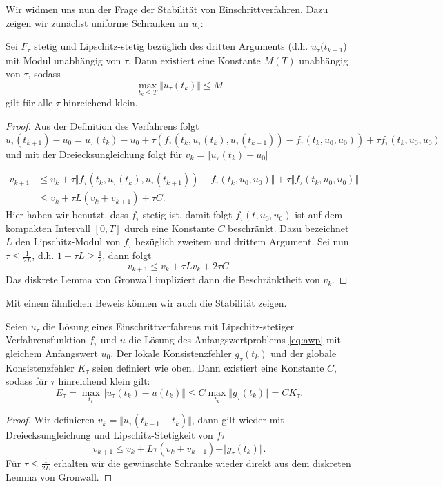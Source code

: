 Wir widmen uns nun der Frage der Stabilität von Einschrittverfahren. Dazu zeigen wir zunächst uniforme Schranken an $u_\tau$:
%
\begin{lemma}{}{}
Sei $F_\tau$ stetig und Lipschitz-stetig bezüglich des dritten Arguments (d.h. $u_\tau(t_{k+1}$) mit Modul unabhängig von $\tau$. Dann existiert eine Konstante $M(T)$ unabhängig von $\tau$, sodass
$$ \max_{t_k \leq T} \Vert u_\tau(t_k) \Vert \leq M $$
gilt für alle $\tau$ hinreichend klein.
\end{lemma}
%
\begin{proof}
Aus der Definition des Verfahrens folgt 
$$ u_\tau(t_{k+1})-u_0 = u_\tau(t_k) - u_0 + \tau (f_\tau(t_k,u_\tau(t_k),u_\tau(t_{k+1}))-f_\tau(t_k,u_0,u_0)) + \tau f_\tau(t_k,u_0,u_0) $$
und mit der Dreiecksungleichung folgt für $v_k = \Vert u_\tau(t_k) - u_0 \Vert$

\begin{align*} v_{k+1} &\leq v_k + \tau \Vert f_\tau(t_k,u_\tau(t_k),u_\tau(t_{k+1}))-f_\tau(t_k,u_0,u_0) \Vert + \tau \Vert f_\tau(t_k,u_0,u_0) \Vert \\
&\leq  v_k + \tau L (v_k + v_{k+1}) + \tau C. 
\end{align*}
%
Hier haben wir benutzt, dass $f_\tau$ stetig ist, damit folgt $ f_\tau(t,u_0,u_0) $ ist auf dem kompakten Intervall  $[0,T]$ durch eine Konstante $C$ beschränkt. Dazu bezeichnet $L$ den Lipschitz-Modul von $f_\tau$ bezüglich zweitem und drittem Argument. Sei nun $\tau \leq \frac{1}{2L}$, d.h. $1- \tau L \geq \frac{1}2$, dann folgt 
$$ v_{k+1} \leq v_k + {\tau L} v_k + 2 \tau C. $$
Das diskrete Lemma von Gronwall impliziert dann die Beschränktheit von $v_k$.
\end{proof}

Mit einem ähnlichen Beweis können wir auch die Stabilität zeigen.
%
\begin{theorem}{}{}
Seien $u_\tau$ die Lösung eines Einschrittverfahrens mit Lipschitz-stetiger Verfahrensfunktion $f_\tau$ und $u$ die Lösung des Anfangswertproblems \eqref{eq:awp} mit gleichem Anfangswert $u_0$. Der lokale Konsistenzfehler $g_\tau(t_k)$ und der globale Konsistenzfehler $K_\tau$ seien definiert wie oben. Dann existiert eine Konstante $C$, sodass für $\tau$ hinreichend klein  gilt:
$$ E_\tau = \max_{t_k} \Vert u_\tau(t_k) - u(t_k) \Vert \leq C \max_{t_k} \Vert g_\tau(t_k) \Vert = C K_\tau. $$
\end{theorem}
%
\begin{proof}
Wir definieren $v_k = \Vert u_\tau(t_{k+1} - t_k) \Vert$, dann gilt wieder mit Dreiecksungleichung und Lipschitz-Stetigkeit von $f\tau$
$$ v_{k+1} \leq v_k + L \tau (v_k + v_{k+1}) + \Vert g_\tau(t_k) \Vert. $$
Für $\tau \leq \frac{1}{2L}$ erhalten wir die gewünschte Schranke wieder direkt aus dem diskreten Lemma von Gronwall.
\end{proof}

